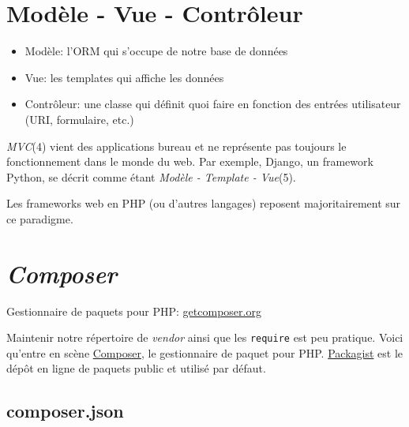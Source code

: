 \hypertarget{moduxe8le---vue---contruxf4leur}{%
\section{Modèle - Vue -
Contrôleur}\label{moduxe8le---vue---contruxf4leur}}

\begin{itemize}
\tightlist
\item
  Modèle: l'ORM qui s'occupe de notre base de données
\item
  Vue: les templates qui affiche les données
\item
  Contrôleur: une classe qui définit quoi faire en fonction des entrées
  utilisateur (URI, formulaire, etc.)
\end{itemize}

\emph{MVC}(4) vient des applications bureau et ne représente pas
toujours le fonctionnement dans le monde du web. Par exemple, Django, un
framework Python, se décrit comme étant \emph{Modèle - Template -
Vue}(5).

Les frameworks web en PHP (ou d'autres langages) reposent
majoritairement sur ce paradigme.

\hypertarget{composer}{%
\section{\texorpdfstring{\emph{Composer}}{Composer}}\label{composer}}

Gestionnaire de paquets pour PHP:
\href{http://getcomposer.org/}{getcomposer.org}

Maintenir notre répertoire de \emph{vendor} ainsi que les
\textenglish{\texttt{require}} est peu pratique. Voici qu'entre en scène
\href{http://getcomposer.org/}{Composer}, le gestionnaire de paquet pour
PHP. \href{https://packagist.org/}{Packagist} est le dépôt en ligne de
paquets public et utilisé par défaut.

\hypertarget{composer.json}{%
\subsection{composer.json}\label{composer.json}}

\begin{english}

\begin{Shaded}
\begin{Highlighting}[]
\FunctionTok{\{}
    \FunctionTok{:} \FunctionTok{\{}
        \FunctionTok{:} \FunctionTok{,}
        \FunctionTok{:} \FunctionTok{,}
    \FunctionTok{\}}
\FunctionTok{\}}
\end{Highlighting}
\end{Shaded}

\end{english}

